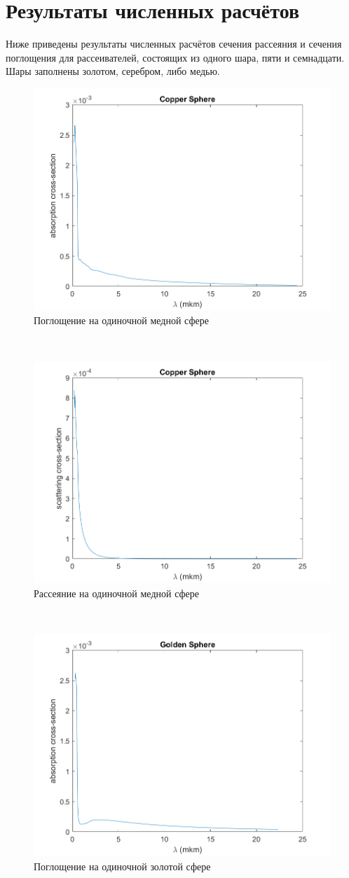 \section{Результаты численных расчётов}
Ниже приведены результаты численных расчётов сечения рассеяния и сечения поглощения для рассеивателей, состоящих из одного шара, пяти и семнадцати. Шары заполнены золотом, серебром, либо медью.
\begin{figure}[h!]
	\centering
	\includegraphics[width=0.5\linewidth]{singleCopperSphereAbsorptionSection}
	\caption{Поглощение на одиночной медной сфере}
	\label{fig:singleCopperSphereAbsorptionSection}
\end{figure} \\
\begin{figure}[h!]
	\centering
	\includegraphics[width=0.5\linewidth]{singleCopperSphereCrossSection}
	\caption{Рассеяние на одиночной медной сфере}
	\label{fig:singleCopperSphereCrossSection}
\end{figure} \\
\begin{figure}[h!]
	\centering
	\includegraphics[width=0.5\linewidth]{singleGoldSphereAbsorptionSection}
	\caption{Поглощение на одиночной золотой сфере}
	\label{fig:singleGoldSphereAbsorptionSection}
\end{figure} \\
